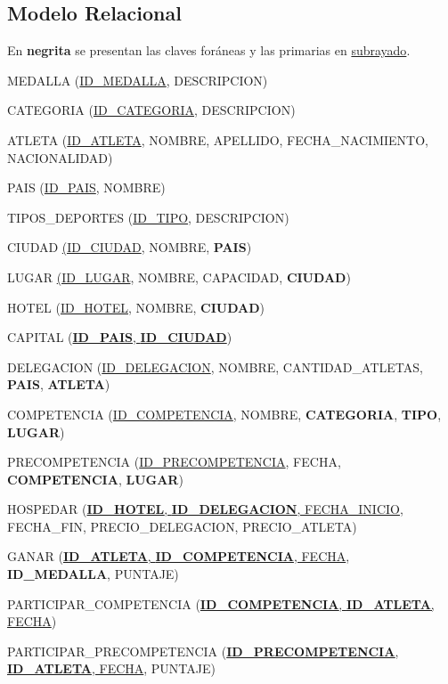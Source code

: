 \documentclass[12pt]{article}
\begin{document}
\subsection{Modelo Relacional}
\label{sec:mr}
\begin{center}
    En \textbf{negrita} se presentan las claves foráneas y las primarias en \underline{subrayado}.\smallskip
\end{center}\bigskip
{\scriptsize
\noindent
MEDALLA (\underline{ID\_MEDALLA}, DESCRIPCION)\bigskip

\noindent
CATEGORIA (\underline{ID\_CATEGORIA}, DESCRIPCION)\bigskip

\noindent
ATLETA (\underline{ID\_ATLETA}, NOMBRE, APELLIDO, FECHA\_NACIMIENTO, NACIONALIDAD)\bigskip

\noindent
PAIS (\underline{ID\_PAIS}, NOMBRE)\bigskip

\noindent
TIPOS\_DEPORTES (\underline{ID\_TIPO}, DESCRIPCION)\bigskip

\noindent
CIUDAD \underline{(ID\_CIUDAD}, NOMBRE, \textbf{PAIS})\bigskip

\noindent
LUGAR \underline{(ID\_LUGAR}, NOMBRE, CAPACIDAD, \textbf{CIUDAD})\bigskip

\noindent
HOTEL (\underline{ID\_HOTEL}, NOMBRE, \textbf{CIUDAD})\bigskip

\noindent
CAPITAL (\underline{\textbf{ID\_PAIS}, \textbf{ID\_CIUDAD}})\bigskip

\noindent
DELEGACION (\underline{ID\_DELEGACION}, NOMBRE, CANTIDAD\_ATLETAS, \textbf{PAIS}, \textbf{ATLETA})\bigskip

\noindent
COMPETENCIA (\underline{ID\_COMPETENCIA}, NOMBRE, \textbf{CATEGORIA}, \textbf{TIPO}, \textbf{LUGAR})\bigskip

\noindent
PRECOMPETENCIA (\underline{ID\_PRECOMPETENCIA}, FECHA, \textbf{COMPETENCIA}, \textbf{LUGAR})\bigskip

\noindent
HOSPEDAR (\underline{\textbf{ID\_HOTEL}, \textbf{ID\_DELEGACION}, FECHA\_INICIO}, FECHA\_FIN, PRECIO\_DELEGACION, PRECIO\_ATLETA)\bigskip

\noindent
GANAR (\underline{\textbf{ID\_ATLETA}, \textbf{ID\_COMPETENCIA}, FECHA}, \textbf{ID\_MEDALLA}, PUNTAJE)\bigskip

\noindent
PARTICIPAR\_COMPETENCIA (\underline{\textbf{ID\_COMPETENCIA}, \textbf{ID\_ATLETA}, FECHA})\bigskip

\noindent
PARTICIPAR\_PRECOMPETENCIA (\underline{\textbf{ID\_PRECOMPETENCIA}, \textbf{ID\_ATLETA}, FECHA}, PUNTAJE)
}
\end{document}
